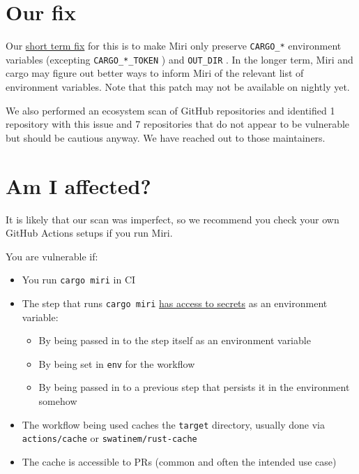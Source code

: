 \documentclass[11pt,a4paper]{article}
\begin{document}
\section{Our fix}

Our \href{https://github.com/rust-lang/miri/pull/5337}{short term fix} for this is to make Miri only preserve \texttt{CARGO_*} environment variables (excepting \texttt{CARGO_*_TOKEN} ) and \texttt{OUT_DIR} . In the longer term, Miri and cargo may figure out better ways to inform Miri of the relevant list of environment variables. Note that this patch may not be available on nightly yet.

We also performed an ecosystem scan of GitHub repositories and identified 1 repository with this issue and 7 repositories that do not appear to be vulnerable but should be cautious anyway. We have reached out to those maintainers.

\section{Am I affected?}

It is likely that our scan was imperfect, so we recommend you check your own GitHub Actions setups if you run Miri.

You are vulnerable if:

\begin{itemize}
\item You run \texttt{cargo miri} in CI
\item The step that runs \texttt{cargo miri} \href{https://docs.github.com/en/actions/how-tos/write-workflows/choose-what-workflows-do/use-secrets\#using-secrets-in-a-workflow}{has access to secrets} as an environment variable:
  \begin{itemize}
\item By being passed in to the step itself as an environment variable
\item By being set in \texttt{env} for the workflow
\item By being passed in to a previous step that persists it in the environment somehow
  \end{itemize}
\item The workflow being used caches the \texttt{target} directory, usually done via \texttt{actions/cache} or \texttt{swatinem/rust-cache}
\item The cache is accessible to PRs (common and often the intended use case)
\end{itemize}
\end{document}

